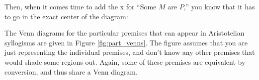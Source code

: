 Then, when it comes time to add the x for ``Some $M$ are $P$,'' you know that it has to go in the exact center of the diagram:

\begin{center}
\end{center}

The Venn diagrams for the particular premises that can appear in Aristotelian syllogisms are given in Figure \ref{fig:part_venns}. The figure assumes that you are just representing the individual premises, and don't know any other premises that would shade some regions out. Again, some of these premises are equivalent by conversion, and thus share a Venn diagram.

